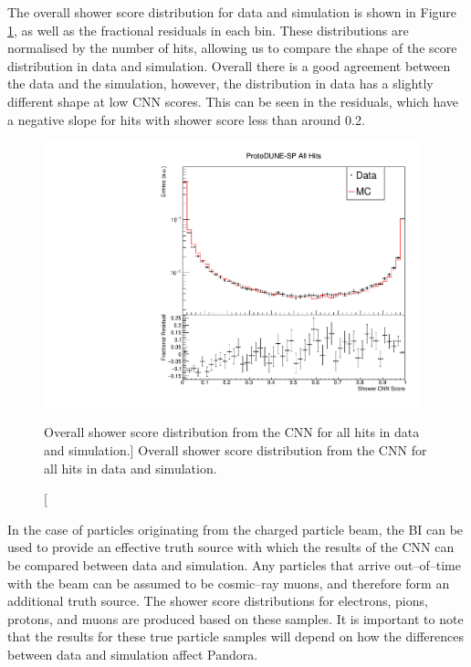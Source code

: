 The overall shower score distribution for data and simulation is shown in 
Figure \ref{fig:cnn_overall_score}, as well as the fractional residuals in 
each bin. These distributions are normalised by the number of hits, allowing us
to compare the shape of the score distribution in data and simulation.  
Overall there is a good agreement between the data and the simulation, 
however, the distribution in data has a slightly different shape at low CNN
scores. This can be seen in the residuals, which have a negative slope for 
hits with shower score less than around 0.2.
\begin{figure}[h!]
	\centering
	\includegraphics[width=0.97\textwidth]{figures/hit_cnn_all.pdf}
	\caption
	[Overall shower score distribution from the CNN for all hits in data and simulation.]
	{Overall shower score distribution from the CNN for all hits in data and simulation.}
	\label{fig:cnn_overall_score}
\end{figure}

In the case of particles originating from the charged particle beam, the BI can
be used to provide an effective truth source with which the results of the CNN 
can be compared between data and simulation. Any particles that arrive
out--of--time with the beam can be assumed to be cosmic--ray muons, and 
therefore form an additional truth source. The shower score distributions for
electrons, pions, protons, and muons are produced based on these samples. It is
important to note that the results for these true particle samples will depend 
on how the differences between data and simulation affect Pandora.

